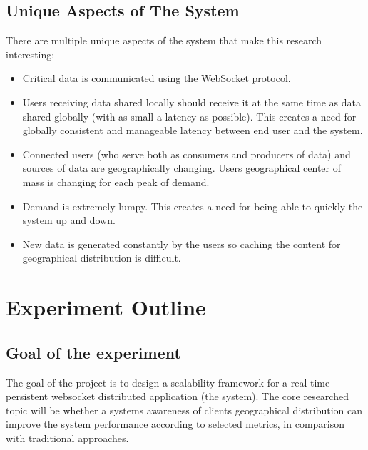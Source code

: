 \documentclass{uvamscse}
\begin{document}
\section{Unique Aspects of The System}

There are multiple unique aspects of the system that make this research interesting:

\begin{itemize}
  \item Critical data is communicated using the WebSocket protocol.
  \item Users receiving data shared locally should receive it at the same time as data shared globally (with as small a latency as possible). This creates a need for globally consistent and manageable latency between end user and the system.
  \item Connected users (who serve both as consumers and producers of data) and sources of data are geographically changing. Users geographical center of mass is changing for each peak of demand.
  \item Demand is extremely lumpy. This creates a need for being able to quickly the system up and down.
  \item New data is generated constantly by the users so caching the content for geographical distribution is difficult.
\end{itemize}



\chapter{Experiment Outline} \label{Experiment Outline}

\section{Goal of the experiment}

The goal of the project is to design a scalability framework for a real-time persistent websocket distributed application (the system). The core researched topic will be whether a systems awareness of clients geographical distribution can improve the system performance according to selected metrics, in comparison with traditional approaches.
\end{document}
